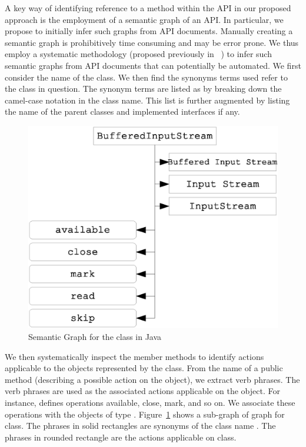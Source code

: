 A key way of identifying reference to a method within the API in our proposed approach is the employment of a semantic graph of an API.
In particular, we propose to initially infer such graphs from API documents.
Manually creating a semantic graph is prohibitively time consuming and may be error prone.
We thus employ a systematic methodology (proposed previously in ~\cite{pandita13:WHYPER}) to infer such semantic graphs from API documents that can potentially be automated.
We first consider the name of the class.
We then find the synonyms terms used refer to the class in question.
The synonym terms are listed as by breaking down the camel-case notation in the class name.
This list is further augmented by listing the name of the parent classes and implemented interfaces if any. 

\begin{figure}
	\centering
		\includegraphics[scale=0.4]{KnowledgeGraph.eps}
	\caption{Semantic Graph for the  class in Java}
	\label{fig:knowledge}
\end{figure} 


We then systematically inspect the member methods to identify actions applicable to the objects represented by the class. From the name of a public method (describing a possible action on the object), we extract verb phrases. The verb phrases are used as the associated actions applicable on the object. For instance,  defines operations available, close, mark, and so on. We associate these operations with the objects of type . Figure~\ref{fig:knowledge} shows a sub-graph of  graph for  class. The phrases in solid rectangles are synonyms of the class name . The phrases in rounded rectangle are the actions applicable on  class.
  


